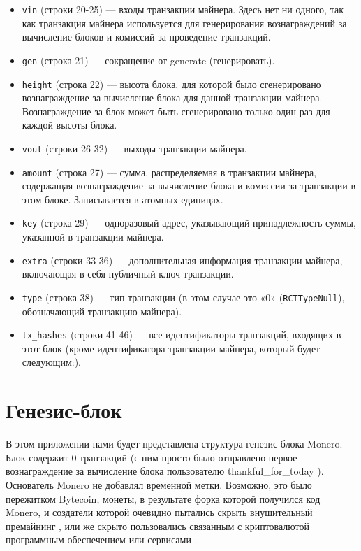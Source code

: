 \begin{appendices}
\begin{itemize}
    \item {\tt vin} (строки 20-25) — входы транзакции майнера. Здесь нет ни одного, так как транзак\-ция майнера используется для генерирования вознаграждений за вычисление блоков и комиссий за проведение транзакций.
    \item {\tt gen} (строка 21) — сокращение от generate (генерировать).
    \item {\tt height} (строка 22) — высота блока, для которой было сгенерировано вознаграждение за вычисление блока для данной транзакции майнера. Вознаграждение за блок может быть сгенерировано только один раз для каждой высоты блока.
    \item {\tt vout} (строки 26-32) — выходы транзакции майнера.
    \item {\tt amount} (строка 27) — сумма, распределяемая в транзакции майнера, содержащая возна\-граждение за вычисление блока и комиссии за транзакции в этом блоке. Записывается в атомных единицах.
    \item {\tt key} (строка 29) — одноразовый адрес, указывающий принадлежность суммы, указанной в транзакции майнера.
    \item {\tt extra} (строки 33-36) — дополнительная информация транзакции майнера, включающая в себя публичный ключ транзакции.
    \item {\tt type} (строка 38) — тип транзакции (в этом случае это «0» ({\tt RCTTypeNull}), обозначающий транзакцию майнера).
    \item {\tt tx\_hashes} (строки 41-46) — все идентификаторы транзакций, входящих в этот блок (кроме идентификатора транзакции майнера, который будет следующим:).
\end{itemize}




\chapter{Генезис-блок}
\label{appendix:genesis-block}

В этом приложении нами будет представлена структура генезис-блока Monero. Блок содержит 0 транзакций (с ним просто было отправлено первое вознаграждение за вычисление блока пользователю thankful\_for\_today \cite{bitmonero-launched}). Основатель Monero не добавлял временной метки. Возможно, это было пережитком Bytecoin, монеты, в результате форка которой получился код Monero, и создатели которой очевидно пытались скрыть внушительный премайнинг \cite{monero-history}, или же скрыто пользовались связанным с криптовалютой программным обеспечением или сервисами \cite{bytecoin-network}.


\end{appendices}
